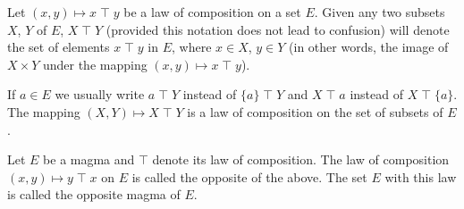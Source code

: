 \documentclass[twoside,usebookdim]{bourbaki}
\begin{document}
Let $(x,y)\mapsto x\mathbin{\top} y$ be a law of composition on a set $E$. Given
any two subsets $X$, $Y$ of $E$, $X \mathbin{\top} Y$ (provided this notation does
not lead to confusion) will denote the set of elements $x\mathbin{\top} y$ in $E$,
where $x\in X$, $y\in Y$ (in other words, the image of $X\times Y$ under
the mapping $(x,y)\mapsto x\mathbin{\top} y$).

If $a\in E$ we usually write $a\mathbin{\top} Y$ instead of $\{a\}\mathbin{\top} Y$ and
$X\mathbin{\top} a$ instead of $X\mathbin{\top}\{a\}$. The mapping $(X, Y)\mapsto X\mathbin{\top} Y$
is a law of composition on the set of subsets of $E$.

\begin{definition}
Let $E$ be a magma and $\mathbin{\top}$ denote its law of composition. The law of
composition $(x, y)\mapsto y\mathbin{\top} x$ on $E$ is called the opposite of the
above. The set $E$ with this law is called the opposite magma of $E$.
\end{definition}
\end{document}

